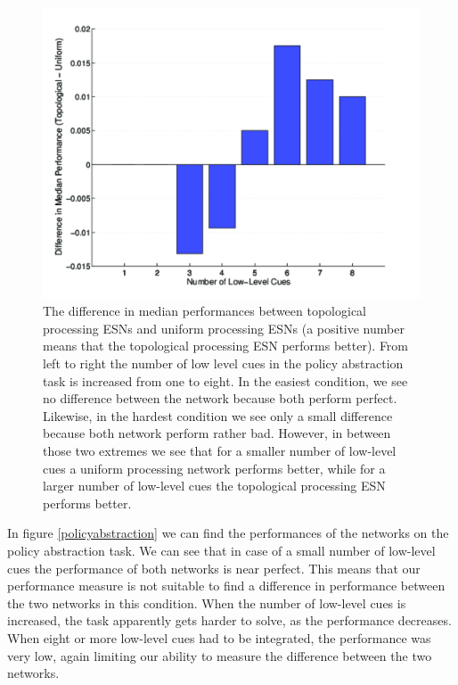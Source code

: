 \documentclass[10pt,a4paper]{report}
\begin{document}
\begin{figure}[bthp]
\includegraphics[width=\textwidth]{figures/polbar.png}
\caption{The difference in median performances between topological processing ESNs and uniform processing ESNs (a positive number means that the topological processing ESN performs better). From left to right the number of low level cues in the policy abstraction task is increased from one to eight. In the easiest condition, we see no difference between the network because both perform perfect. Likewise, in the hardest condition we see only a small difference because both network perform rather bad. However, in between those two extremes we see that for a smaller number of low-level cues a uniform processing network performs better, while for a larger number of low-level cues the topological processing ESN performs better.}
\label{policyabstractionbar}
\end{figure}

In figure \ref{policyabstraction} we can find the performances of the networks on the policy abstraction task. We can see that in case of a small number of low-level cues the performance of both networks is near perfect. This means that our performance measure is not suitable to find a difference in performance between the two networks in this condition. When the number of low-level cues is increased, the task apparently gets harder to solve, as the performance decreases. When eight or more low-level cues had to be integrated, the performance was very low, again limiting our ability to measure the difference between the two networks.
\end{document}
